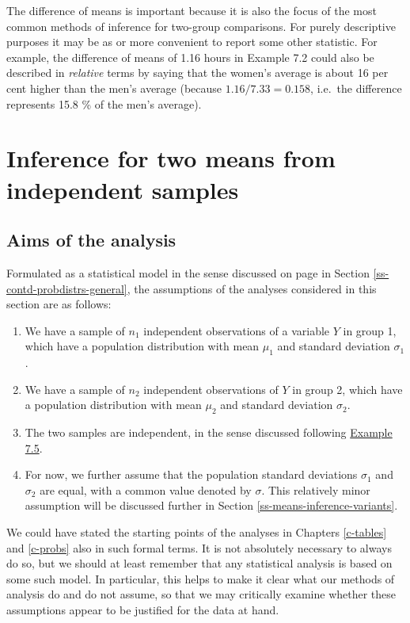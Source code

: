 \documentclass[11pt,a4paper,openany]{book}
\begin{document}
The difference of means is important because it is also the focus of the
most common methods of inference for two-group comparisons. For purely
descriptive purposes it may be as or more convenient to report some
other statistic. For example, the difference of means of 1.16 hours in
Example 7.2 could also be described in \emph{relative} terms by saying
that the women's average is about 16 per cent higher than the men's
average (because \(1.16/7.33=0.158\), i.e.~the difference represents
15.8 \% of the men's average).

\section{Inference for two means from independent
samples}\label{s-means-inference}

\subsection{Aims of the analysis}\label{ss-means-inference-intro}

Formulated as a statistical model in the sense discussed on page in
Section \ref{ss-contd-probdistrs-general}, the assumptions of the
analyses considered in this section are as follows:

\begin{enumerate}
\def\labelenumi{\arabic{enumi}.}
\item
  \label{p-2sample} We have a sample of \(n_{1}\) independent
  observations of a variable \(Y\) in group 1, which have a population
  distribution with mean \(\mu_{1}\) and standard deviation
  \(\sigma_{1}\).
\item
  We have a sample of \(n_{2}\) independent observations of \(Y\) in
  group 2, which have a population distribution with mean \(\mu_{2}\)
  and standard deviation \(\sigma_{2}\).
\item
  The two samples are independent, in the sense discussed following
  \protect\hyperlink{p-ex75}{Example 7.5}.
\item
  For now, we further assume that the population standard deviations
  \(\sigma_{1}\) and \(\sigma_{2}\) are equal, with a common value
  denoted by \(\sigma\). This relatively minor assumption will be
  discussed further in Section \ref{ss-means-inference-variants}.
\end{enumerate}

We could have stated the starting points of the analyses in Chapters
\ref{c-tables} and \ref{c-probs} also in such formal terms. It is not
absolutely necessary to always do so, but we should at least remember
that any statistical analysis is based on some such model. In
particular, this helps to make it clear what our methods of analysis do
and do not assume, so that we may critically examine whether these
assumptions appear to be justified for the data at hand.
\end{document}

